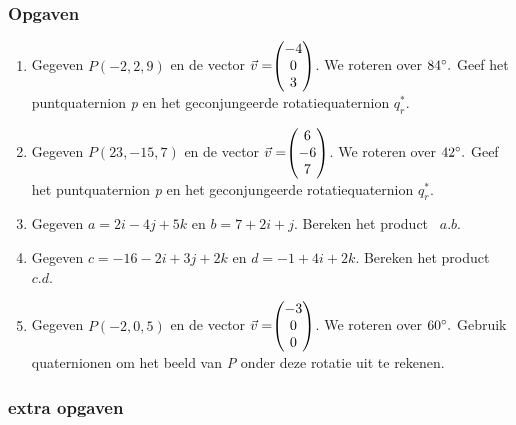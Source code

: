 \documentclass[hidelinks, a4wide, 12pt,  twoside]{book}
\begin{document}
\subsubsection{Opgaven}
\begin{enumerate}
	\item Gegeven $ P (-2, 2, 9) $ en de vector $\vec{v} = \vecdrie{-4}{0}{3} $. 
	We roteren over $ 84\degree. $ Geef het puntquaternion \textit{p} en het geconjungeerde rotatiequaternion  $  q_r^* $.
	\item Gegeven $ P (23, -15, 7) $ en de vector $\vec{v} = \vecdrie{6}{-6}{7} $. 
	We roteren over $ 42\degree. $ Geef het puntquaternion \textit{p} en het geconjungeerde rotatiequaternion  $  q_r^* $.
	
	\item Gegeven $ a = 2i-4j+5k$ en   $ b = 7+2i+j $. 
	Bereken het product \ $  a.b $.
	\item Gegeven $ c = -16 -2i+3j+2k $ en   $ d = -1+4i+2k $. 
	Bereken het product \ $  c.d $.
	
	\item Gegeven $ P (-2, 0, 5) $ en de vector $\vec{v} = \vecdrie{-3}{0}{0} $. 
	We roteren over $ 60\degree. $ Gebruik quaternionen om het beeld van \textit{P }onder deze rotatie uit te rekenen.
	
\end{enumerate}

\subsubsection{extra opgaven}
\end{document}

